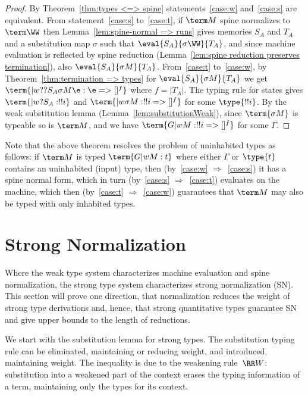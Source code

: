\documentclass[10pt,a4paper]{amsart}
\begin{document}
\begin{proof}
By Theorem~\ref{thm:types <=> spine} statements~\ref{case:w} and~\ref{case:s} are equivalent. From statement~\ref{case:s} to~\ref{case:t}, if $\term M$ spine normalizes to $\term\WW$ then Lemma~\ref{lem:spine-normal => runs} gives memories $S_A$ and $T_A$ and a substitution map $\sigma$ such that $\eval{S_A}{\sigma\WW}{T_A}$, and since machine evaluation is reflected by spine reduction (Lemma~\ref{lem:spine reduction preserves termination}), also $\eval{S_A}{\sigma M}{T_A}$. From~\ref{case:t} to~\ref{case:w}, by Theorem~\ref{thm:termination => types} for $\eval{S_A}{\sigma M}{T_A}$ we get $\term{|w ??{S_A}{\sigma M}\e : \e=>[]^f}$ where $f=|T_A|$. The typing rule for states gives $\term{|w ?{S_A}:!!i}$ and $\term{|w \sigma M: !!i => []^f}$ for some $\type{!!i}$. By the weak substitution lemma (Lemma~\ref{lem:substitutionWeak}), since $\term{\sigma M}$ is typeable so is $\term M$, and we have $\term{G |w M: !!i => []^f}$ for some $\Gamma$.
\end{proof}

Note that the above theorem resolves the problem of uninhabited types as follows: if $\term M$ is typed $\term{G |w M:t}$ where either $\Gamma$ or $\type{t}$ contains an uninhabited (input) type, then (by~\ref{case:w} $\Rightarrow$~\ref{case:s}) it has a spine normal form, which in turn (by~\ref{case:s} $\Rightarrow$~\ref{case:t}) evaluates on the machine, which then (by~\ref{case:t} $\Rightarrow$~\ref{case:w}) guarantees that $\term M$ may also be typed with only inhabited types. 


\section{Strong Normalization}
\label{sec:SN}

Where the weak type system characterizes machine evaluation and spine normalization, the strong type system characterizes strong normalization (SN). This section will prove one direction, that normalization reduces the weight of strong type derivations and, hence, that strong quantitative types guarantee SN and give upper bounds to the length of reductions. 

We start with the substitution lemma for strong types. The substitution typing rule can be eliminated, maintaining or reducing weight, and introduced, maintaining weight. The inequality is due to the weakening rule~$\RR W$: substitution into a weakened part of the context erases the typing information of a term, maintaining only the types for its context.
\end{document}
